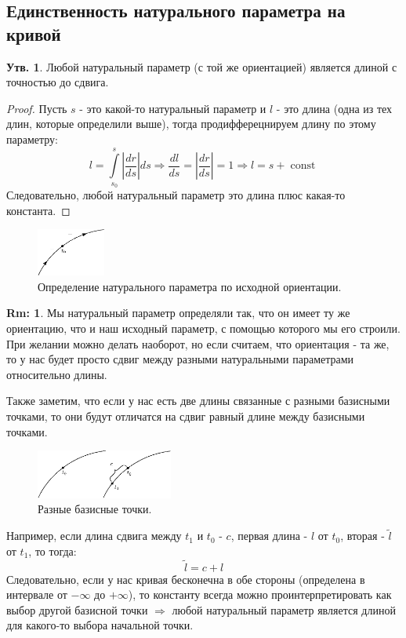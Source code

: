 \documentclass[12pt]{article}
\theoremstyle{definition}
\newtheorem{rem}{Rm:}
\newtheorem{prop}{Утв.}
\DeclareMathOperator{\const}{\text{const}}
\newcommand{\ddint}[2]{\displaystyle\int\limits_{#1}^{#2}}
\newcommand{\wte}[1]{\widetilde{#1}}
\begin{document}
\subsection*{Единственность натурального параметра на кривой}

\begin{prop}
	Любой натуральный параметр (с той же ориентацией) является длиной с точностью до сдвига.
\end{prop}
\begin{proof}
	Пусть $s$ - это какой-то натуральный параметр и $l$ - это длина (одна из тех длин, которые определили выше), тогда продифферецнируем длину по этому параметру: 
	$$
		l = \ddint{s_0}{s}\left|\dfrac{dr}{ds}\right|ds \Rightarrow \dfrac{dl}{ds} = \left|\dfrac{dr}{ds}\right| = 1 \Rightarrow l = s + \const
	$$
	Следовательно, любой натуральный параметр это длина плюс какая-то константа.
\end{proof}
\begin{figure}[H]
	\centering
	\includegraphics[width=0.2\textwidth]{CDGL1_11.eps}
	\caption{Определение натурального параметра по исходной ориентации.}
	\label{1_11}
\end{figure}
\begin{rem}
	Мы натуральный параметр определяли так, что он имеет ту же ориентацию, что и наш исходный параметр, с помощью которого мы его строили. При желании можно делать наоборот, но если считаем, что ориентация  - та же, то у нас будет просто сдвиг между разными натуральными параметрами относительно длины.
\end{rem}
Также заметим, что если у нас есть две длины связанные с разными базисными точками, то они будут отличатся на сдвиг равный длине между базисными точками. 
\begin{figure}[H]
	\centering
	\includegraphics[width=0.4\textwidth]{CDGL1_12.eps}
	\caption{Разные базисные точки.}
	\label{1_12}
\end{figure}
Например, если длина сдвига между $t_1$ и $t_0$ - $c$, первая длина - $l$ от $t_0$, вторая - $\wte{l}$ от $t_1$, то тогда:
$$
	\wte{l} = c + l
$$
Следовательно, если у нас кривая бесконечна в обе стороны (определена в интервале от $-\infty$ до $+\infty$), то константу всегда можно проинтерпретировать как выбор другой базисной точки $\Rightarrow$ любой натуральный параметр является длиной для какого-то выбора начальной точки.
\end{document}
